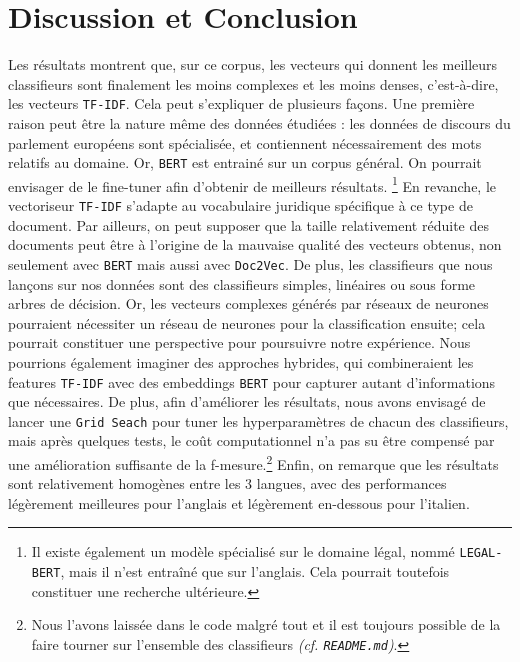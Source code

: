 \section{Discussion et Conclusion}

Les résultats montrent que, sur ce corpus, les vecteurs qui donnent les meilleurs classifieurs sont finalement les moins complexes et les moins denses, c'est-à-dire, les vecteurs \texttt{TF-IDF}. Cela peut s'expliquer de plusieurs façons. Une première raison peut être la nature même des données étudiées : les données de discours du parlement européens sont spécialisée, et contiennent nécessairement des mots relatifs au domaine. Or, \texttt{BERT} est entrainé sur un corpus général. On pourrait envisager de le fine-tuner afin d'obtenir de meilleurs résultats.  \footnote{Il existe également un modèle spécialisé sur le domaine légal, nommé \texttt{LEGAL-BERT}, mais il n'est entraîné que sur l'anglais. Cela pourrait toutefois constituer une recherche ultérieure.} En revanche, le vectoriseur \texttt{TF-IDF} s'adapte au vocabulaire juridique spécifique à ce type de document. Par ailleurs, on peut supposer que la taille relativement réduite des documents peut être à l'origine de la mauvaise qualité des vecteurs obtenus, non seulement avec \texttt{BERT} mais aussi avec \texttt{Doc2Vec}. De plus, les classifieurs que nous lançons sur nos données sont des classifieurs simples, linéaires ou sous forme arbres de décision. Or, les vecteurs complexes générés par réseaux de neurones pourraient nécessiter un réseau de neurones pour la classification ensuite; cela pourrait constituer une perspective pour poursuivre notre expérience. Nous pourrions également imaginer des approches hybrides, qui combineraient les features \texttt{TF-IDF} avec des embeddings \texttt{BERT} pour capturer autant d'informations que nécessaires. De plus, afin d'améliorer les résultats, nous avons envisagé de lancer une \texttt{Grid Seach} pour tuner les hyperparamètres de chacun des classifieurs, mais après quelques tests, le coût computationnel n'a pas su être compensé par une amélioration suffisante de la f-mesure.\footnote{Nous l'avons laissée dans le code malgré tout et il est toujours possible de la faire tourner sur l'ensemble des classifieurs \textit{(cf. \texttt{README.md})}.} Enfin, on remarque que les résultats sont relativement homogènes entre les 3 langues, avec des performances légèrement meilleures pour l'anglais et légèrement en-dessous pour l'italien. 
